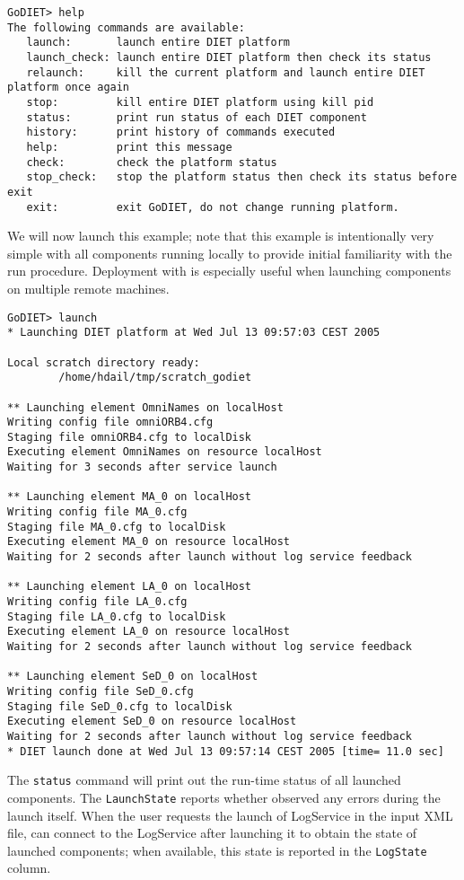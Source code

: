 \begin{verbatim}
GoDIET> help
The following commands are available:
   launch:       launch entire DIET platform
   launch_check: launch entire DIET platform then check its status
   relaunch:     kill the current platform and launch entire DIET platform once again
   stop:         kill entire DIET platform using kill pid
   status:       print run status of each DIET component
   history:      print history of commands executed
   help:         print this message
   check:        check the platform status
   stop_check:   stop the platform status then check its status before exit
   exit:         exit GoDIET, do not change running platform.
\end{verbatim}

We will now launch this example; note that this example is intentionally very
simple with all components running locally to provide initial familiarity with
the \godiet run procedure. Deployment with \godiet is especially useful  when
launching components on multiple remote machines.

\begin{verbatim}
GoDIET> launch
* Launching DIET platform at Wed Jul 13 09:57:03 CEST 2005

Local scratch directory ready:
        /home/hdail/tmp/scratch_godiet

** Launching element OmniNames on localHost
Writing config file omniORB4.cfg
Staging file omniORB4.cfg to localDisk
Executing element OmniNames on resource localHost
Waiting for 3 seconds after service launch

** Launching element MA_0 on localHost
Writing config file MA_0.cfg
Staging file MA_0.cfg to localDisk
Executing element MA_0 on resource localHost
Waiting for 2 seconds after launch without log service feedback

** Launching element LA_0 on localHost
Writing config file LA_0.cfg
Staging file LA_0.cfg to localDisk
Executing element LA_0 on resource localHost
Waiting for 2 seconds after launch without log service feedback

** Launching element SeD_0 on localHost
Writing config file SeD_0.cfg
Staging file SeD_0.cfg to localDisk
Executing element SeD_0 on resource localHost
Waiting for 2 seconds after launch without log service feedback
* DIET launch done at Wed Jul 13 09:57:14 CEST 2005 [time= 11.0 sec]
\end{verbatim}

The \texttt{status} command will print out the run-time status of all launched
components. The \texttt{LaunchState} reports whether \godiet observed any
errors during the launch itself. When the user requests the launch of
LogService in the input XML file, \godiet can connect to the LogService  after
launching it to obtain the state of launched components; when available, this
state is reported in the \texttt{LogState} column.

